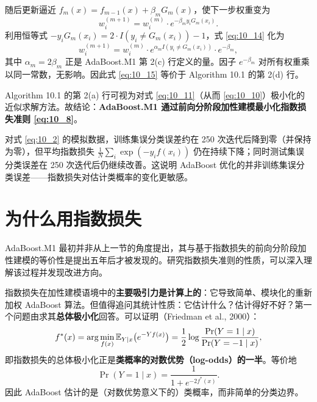 随后更新逼近 $f_m(x) = f_{m-1}(x) + \beta_m G_m(x)$，使下一步权重变为
\begin{equation}\label{eq:10_14}
    w_i^{(m+1)} = w_i^{(m)} \cdot e^{-\beta_m y_i G_m(x_i)}.
\end{equation}
利用恒等式 $-y_i G_m(x_i) = 2 \cdot I(y_i \neq G_m(x_i)) - 1$，式 \eqref{eq:10_14} 化为
\begin{equation}\label{eq:10_15}
    w_i^{(m+1)} = w_i^{(m)} \cdot e^{\alpha_m I(y_i \neq G_m(x_i))} \cdot e^{-\beta_m},
\end{equation}
其中 $\alpha_m = 2\beta_m$ 正是 AdaBoost.M1 第 2(c) 行定义的量。因子 $e^{-\beta_m}$ 对所有权重乘以同一常数，无影响。因此式 \eqref{eq:10_15} 等价于 Algorithm 10.1 的第 2(d) 行。

\begin{remark}
Algorithm 10.1 的第 2(a) 行可视为对式 \eqref{eq:10_11}（从而 \eqref{eq:10_10}）极小化的近似求解方法。故结论：\textbf{AdaBoost.M1 通过前向分阶段加性建模最小化指数损失准则 \eqref{eq:10_8}}。
\end{remark}

\begin{remark}
对式 \eqref{eq:10_2} 的模拟数据，训练集误分类误差约在 250 次迭代后降到零（并保持为零），但平均指数损失 $\frac{1}{N}\sum_i \exp(-y_i f(x_i))$ 仍在持续下降；同时测试集误分类误差在 250 次迭代后仍继续改善。这说明 AdaBoost 优化的并非训练集误分类误差——指数损失对估计类概率的变化更敏感。
\end{remark}

\section{为什么用指数损失}

AdaBoost.M1 最初并非从上一节的角度提出，其与基于指数损失的前向分阶段加性建模的等价性是提出五年后才被发现的。研究指数损失准则的性质，可以深入理解该过程并发现改进方向。

指数损失在加性建模语境中的\textbf{主要吸引力是计算上的}：它导致简单、模块化的重新加权 AdaBoost 算法。但值得追问其统计性质：它估计什么？估计得好不好？第一个问题由求其\textbf{总体极小化}回答。可以证明（Friedman et al., 2000）：
\begin{equation}\label{eq:10_16}
    f^*(x) = \arg\min_{f(x)} \mathbb{E}_{Y \mid x}\bigl(e^{-Y f(x)}\bigr) = \frac{1}{2}\log\frac{\Pr(Y = 1 \mid x)}{\Pr(Y = -1 \mid x)},
\end{equation}
即指数损失的总体极小化正是\textbf{类概率的对数优势（log-odds）的一半}。等价地
\begin{equation}\label{eq:10_17}
    \Pr(Y = 1 \mid x) = \frac{1}{1 + e^{-2 f^*(x)}}.
\end{equation}
因此 AdaBoost 估计的是（对数优势意义下的）类概率，而非简单的分类边界。

